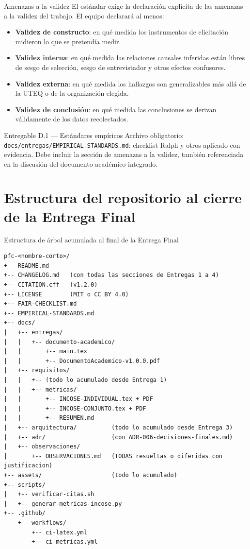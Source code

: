 \documentclass[11pt,a4paper]{article}
\begin{document}
\begin{cajaconcepto}{Amenazas a la validez}
El est\'andar exige la declaraci\'on expl\'icita de las amenazas a la validez del trabajo. El equipo declarar\'a al menos:
\begin{itemize}
    \item \textbf{Validez de constructo}: en qu\'e medida los instrumentos de elicitaci\'on midieron lo que se pretend\'ia medir.
    \item \textbf{Validez interna}: en qu\'e medida las relaciones causales inferidas est\'an libres de sesgo de selecci\'on, sesgo de entrevistador y otros efectos confusores.
    \item \textbf{Validez externa}: en qu\'e medida los hallazgos son generalizables m\'as all\'a de la UTEQ o de la organizaci\'on elegida.
    \item \textbf{Validez de conclusi\'on}: en qu\'e medida las conclusiones se derivan v\'alidamente de los datos recolectados.
\end{itemize}
\end{cajaconcepto}

\begin{cajaentregable}{Entregable D.1 --- Est\'andares emp\'iricos}
Archivo obligatorio: \texttt{docs/entregas/EMPIRICAL-STANDARDS.md}: checklist Ralph y otros aplicado con evidencia. Debe incluir la secci\'on de amenazas a la validez, tambi\'en referenciada en la discusi\'on del documento acad\'emico integrado.
\end{cajaentregable}

\section{Estructura del repositorio al cierre de la Entrega Final}

\begin{cajarepo}{Estructura de \'arbol acumulada al final de la Entrega Final}
\begin{lstlisting}
pfc-<nombre-corto>/
+-- README.md
+-- CHANGELOG.md   (con todas las secciones de Entregas 1 a 4)
+-- CITATION.cff   (v1.2.0)
+-- LICENSE        (MIT o CC BY 4.0)
+-- FAIR-CHECKLIST.md
+-- EMPIRICAL-STANDARDS.md
+-- docs/
|   +-- entregas/
|   |   +-- documento-academico/
|   |       +-- main.tex
|   |       +-- DocumentoAcademico-v1.0.0.pdf
|   +-- requisitos/
|   |   +-- (todo lo acumulado desde Entrega 1)
|   |   +-- metricas/
|   |       +-- INCOSE-INDIVIDUAL.tex + PDF
|   |       +-- INCOSE-CONJUNTO.tex + PDF
|   |       +-- RESUMEN.md
|   +-- arquitectura/          (todo lo acumulado desde Entrega 3)
|   +-- adr/                   (con ADR-006-decisiones-finales.md)
|   +-- observaciones/
|       +-- OBSERVACIONES.md   (TODAS resueltas o diferidas con justificacion)
+-- assets/                    (todo lo acumulado)
+-- scripts/
|   +-- verificar-citas.sh
|   +-- generar-metricas-incose.py
+-- .github/
    +-- workflows/
        +-- ci-latex.yml
        +-- ci-metricas.yml
\end{lstlisting}
\end{cajarepo}
\end{document}
